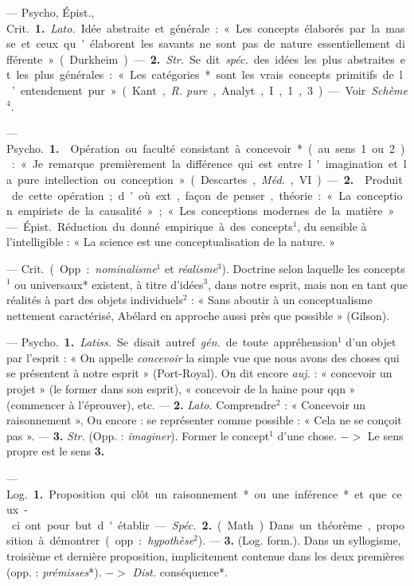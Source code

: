 \begin{itemize}[leftmargin=1cm, label=, itemsep=11pt]
 — \si{Psycho, Épist., Crit.} {\bf 1.}
 {\it Lato.} Idée abstraite et générale :
« Les concepts élaborés par la masse
et ceux qu’élaborent les savants ne
sont pas de nature essentiellement
différente » (Durkheim). — {\bf 2.}  {\it Str.}
Se dit  {\it spéc.} des idées les plus
abstraites et les plus générales :
« Les catégories* sont les vrais
concepts primitifs de l’entendement
pur » (Kant, {\it R. pure}, Analyt., I, 1, 3).
— Voir {\it Schème}$^4$.

 — \si{Psycho.} {\bf 1.}  Opération ou faculté consistant à concevoir* (au sens 1 ou 2) : « Je remarque
premièrement la différence qui est
entre l'imagination et la pure intellection ou conception » (Descartes,
{\it Méd.}, VI). — {\bf 2.}  Produit de cette
opération; d’où ext., façon de penser,
théorie : « La conception empiriste
de la causalité »; « Les conceptions
modernes de la matière ».

 — \si{Épist.} Réduction
du donné empirique à des concepts$^1$,
du sensible à l'intelligible : « La
science est une conceptualisation de
la nature. »

 — \si{Crit.} (Opp. : {\it nominalisme}$^1$ et {\it réalisme}$^3$).
 Doctrine
selon laquelle les concepts$^1$ ou universaux* existent, à titre d'idées$^3$,
dans notre esprit, mais non en tant
que réalités à part des objets individuels$^2$ : « Sans aboutir à un conceptualisme nettement caractérisé, Abélard en approche aussi près que possible » (Gilson).

 — \si{Psycho.} {\bf 1.} {\it Latiss.} Se
disait autref. {\it gén.} de toute appréhension$^1$ d’un objet par l'esprit : « On
appelle {\it concevoir} la simple vue que
nous avons des choses qui se présentent
à notre esprit » (Port-Royal).
On dit encore {\it auj.} : « concevoir un
projet » (le former dans son esprit),
« concevoir de la haine pour qqn »
(commencer à l’éprouver), etc. —
{\bf 2.}  {\it Lato.} Comprendre$^2$ : « Concevoir
un raisonnement », Ou encore : se
représenter comme possible : « Cela
ne se conçoit pas ». — {\bf 3.} {\it Str.} (Opp. :
{\it imaginer}). Former le concept$^1$ d’une
chose. $->$ Le sens propre est le
sens {\bf 3.}

 — \si{Log.} {\bf 1.} Proposition
qui clôt un raisonnement* ou une
inférence* et que ceux-ci ont pour
but d'établir. — {\it Spéc.} {\bf 2.} (Math)
Dans un théorème, proposition à
démontrer (opp. : {\it hypothèse}$^2$). —
{\bf 3.} (Log. form.). Dans un syllogisme, troisième et dernière proposition, implicitement contenue dans
les deux premières (opp. : {\it prémisses}*). $->$ {\it Dist.} conséquence*.


\end{itemize}
